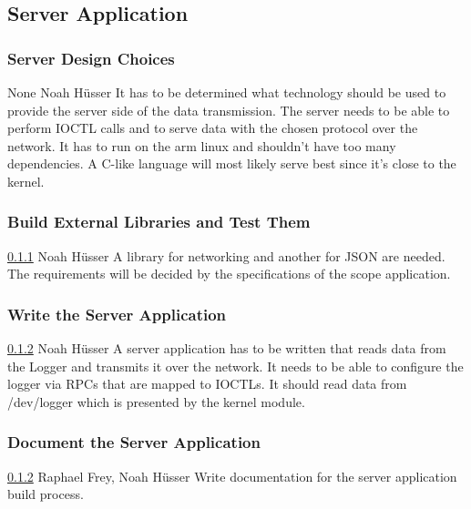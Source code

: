 \documentclass[a4paper,oneside]{alpenspecs/alpenspecs}
\begin{document}
\subsection{Server Application}
\label{subsec:fw:server}

\subsubsection{Server Design Choices}
\label{subsubsec:fw:server:design-decisions}
\wpac
    {}
    {}
    {}
    {None}
    {}
    {Noah H\"usser}
    {%
        It has to be determined what technology should be used to provide the server side of the data transmission.
        The server needs to be able to perform IOCTL calls and to serve data with the chosen protocol over the network. It has to run on the arm linux and shouldn't have too many dependencies.
        A C-like language will most likely serve best since it's close to the kernel.
    }

\subsubsection{Build External Libraries and Test Them}
\label{subsubsec:fw:server:external}
\wpac
    {}
    {}
    {}
    {\ref{subsubsec:fw:server:design-decisions}}
    {}
    {Noah H\"usser}
    {%
        A library for networking and another for JSON are needed. The requirements will be decided by the specifications of the scope application.
    }

\subsubsection{Write the Server Application}
\label{subsubsec:fw:server:server}
\wpac
    {}
    {}
    {}
    {\ref{subsubsec:fw:server:external}}
    {}
    {Noah H\"usser}
    {%
        A server application has to be written that reads data from the Logger and transmits it over the network.
        It needs to be able to configure the logger via RPCs that are mapped to IOCTLs.
        It should read data from /dev/logger which is presented by the kernel module.
    }

\subsubsection{Document the Server Application}
\label{subsubsec:fw:server:docs}
\wpac
    {}
    {}
    {}
    {\ref{subsubsec:fw:server:external}}
    {}
    {Raphael Frey, Noah H\"usser}
    {%
        Write documentation for the server application build process.
    }
\end{document}
